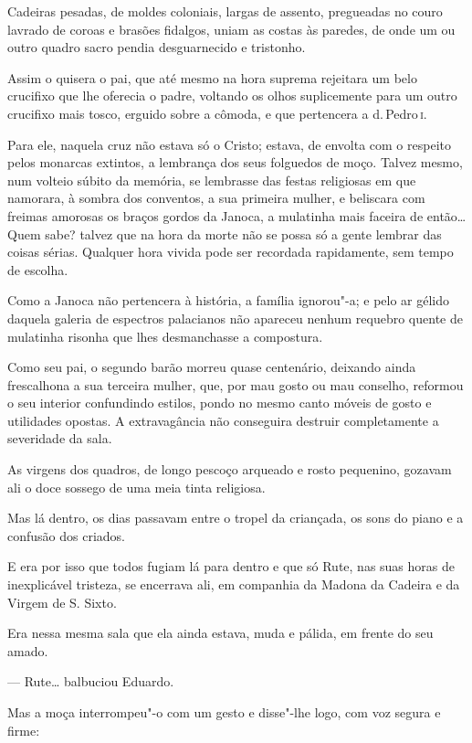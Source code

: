 Cadeiras pesadas, de moldes coloniais, largas de assento, pregueadas no
couro lavrado de coroas e brasões fidalgos, uniam as costas às paredes,
de onde um ou outro quadro sacro pendia desguarnecido e tristonho.

Assim o quisera o pai, que até mesmo na hora suprema rejeitara um belo
crucifixo que lhe oferecia o padre, voltando os olhos suplicemente para
um outro crucifixo mais tosco, erguido sobre a cômoda, e que pertencera
a d.\,Pedro\,\textsc{i}.

Para ele, naquela cruz não estava só o Cristo; estava, de envolta com o
respeito pelos monarcas extintos, a lembrança dos seus folguedos de
moço. Talvez mesmo, num volteio súbito da memória, se lembrasse das
festas religiosas em que namorara, à sombra dos conventos, a sua
primeira mulher, e beliscara com freimas amorosas os braços gordos da
Janoca, a mulatinha mais faceira de então\ldots{} Quem sabe? talvez que na
hora da morte não se possa só a gente lembrar das coisas sérias.
Qualquer hora vivida pode ser recordada rapidamente, sem tempo de
escolha.

Como a Janoca não pertencera à história, a família ignorou"-a; e pelo ar
gélido daquela galeria de espectros palacianos não apareceu nenhum
requebro quente de mulatinha risonha que lhes desmanchasse a compostura.

Como seu pai, o segundo barão morreu quase centenário, deixando ainda
frescalhona a sua terceira mulher, que, por mau gosto ou mau conselho,
reformou o seu interior confundindo estilos, pondo no mesmo canto móveis
de gosto e utilidades opostas. A extravagância não conseguira destruir
completamente a severidade da sala.

As virgens dos quadros, de longo pescoço arqueado e rosto pequenino,
gozavam ali o doce sossego de uma meia tinta religiosa.

Mas lá dentro, os dias passavam entre o tropel da criançada, os sons do
piano e a confusão dos criados.

E era por isso que todos fugiam lá para dentro e que só Rute, nas suas
horas de inexplicável tristeza, se encerrava ali, em companhia da Madona
da Cadeira e da Virgem de S. Sixto.

Era nessa mesma sala que ela ainda estava, muda e pálida, em frente do
seu amado.

--- Rute\ldots{} balbuciou Eduardo.

Mas a moça interrompeu"-o com um gesto e disse"-lhe logo, com voz segura e
firme:

